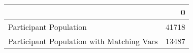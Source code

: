 \begin{tabular}{lr}
\toprule
{} &      0 \\
\midrule
Participant Population                    &  41718 \\
Participant Population with Matching Vars &  13487 \\
\bottomrule
\end{tabular}
